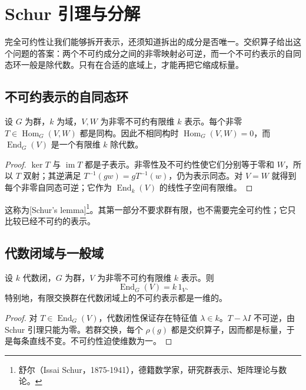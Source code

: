 

\section{Schur 引理与分解}
\label{b5:sec:0104}

完全可约性让我们能够拆开表示，还须知道拆出的成分是否唯一。交织算子给出这个问题的答案：两个不可约成分之间的非零映射必可逆，而一个不可约表示的自同态环一般是除代数。只有在合适的底域上，才能再把它缩成标量。


\subsection{不可约表示的自同态环}
\label{b5:subsec:0104:01}

\begin{lemma}[Schur]\label{b5:lem:schur}
	设 \(G\) 为群，\(k\) 为域，\(V,W\) 为非零不可约有限维 \(k\) 表示。每个非零 \(T\in\operatorname{Hom}_G(V,W)\) 都是同构。因此不相同构时 \(\operatorname{Hom}_G(V,W)=0\)，而 \(\operatorname{End}_G(V)\) 是一个有限维 \(k\) 除代数。
\end{lemma}
\begin{proof}
	\(\ker T\) 与 \(\operatorname{im}T\) 都是子表示。非零性及不可约性使它们分别等于零和 \(W\)，所以 \(T\) 双射；其逆满足 \(T^{-1}(gw)=gT^{-1}(w)\)，仍为表示同态。对 \(V=W\) 就得到每个非零自同态可逆；它作为 \(\operatorname{End}_k(V)\) 的线性子空间有限维。
\end{proof}

这称为[Schur's lemma]\footnote{舒尔（Issai Schur，1875-1941），德籍数学家，研究群表示、矩阵理论与数论。}。其第一部分不要求群有限，也不需要完全可约性；它只比较已经不可约的表示。

\subsection{代数闭域与一般域}
\label{b5:subsec:0104:02}

\begin{corollary}\label{b5:cor:schur-algebraically-closed}
	设 \(k\) 代数闭，\(G\) 为群，\(V\) 为非零不可约有限维 \(k\) 表示。则
	\[
		\operatorname{End}_G(V)=k\,1_V.
	\]
	特别地，有限交换群在代数闭域上的不可约表示都是一维的。
\end{corollary}
\begin{proof}
	对 \(T\in\operatorname{End}_G(V)\)，代数闭性保证存在特征值 \(\lambda\in k\)。\(T-\lambda I\) 不可逆，由 Schur 引理只能为零。若群交换，每个 \(\rho(g)\) 都是交织算子，因而都是标量，于是每条直线不变。不可约性迫使维数为一。
\end{proof}

